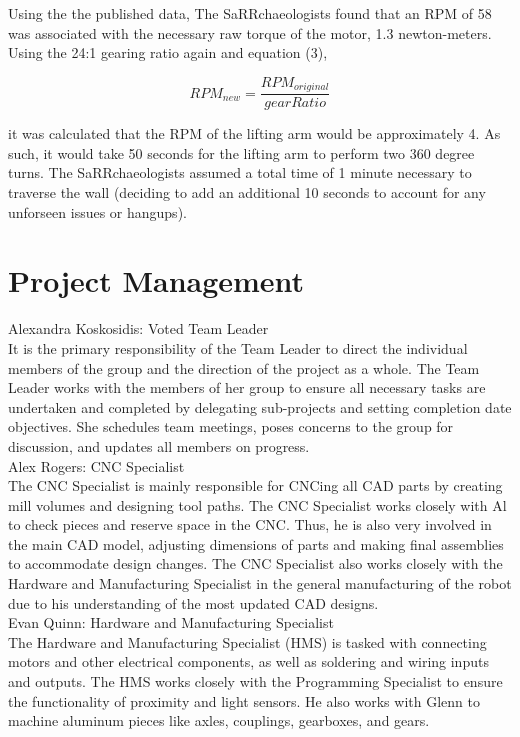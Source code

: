 \documentclass[12pt]{article}
\begin{document}
Using the the published data, The SaRRchaeologists found that an RPM of 58 was associated with the necessary raw torque of the motor, 1.3 newton-meters. Using the 24:1 gearing ratio again and equation (3),

\begin{equation}
    RPM_{new} = \frac{RPM_{original}}{gearRatio} 
\end{equation}


it was calculated that the RPM of the lifting arm would be approximately 4. As such, it would take 50 seconds for the lifting arm to perform two 360 degree turns. The SaRRchaeologists assumed a total time of 1 minute necessary to traverse the wall (deciding to add an additional 10 seconds to account for any unforseen issues or hangups). 

\section{Project Management}
Alexandra Koskosidis: Voted Team Leader\\

    It is the primary responsibility of the Team Leader to direct the individual members of the group and the direction of the project as a whole. The Team Leader works with the members of her group to ensure all necessary tasks are undertaken and completed by delegating sub-projects and setting completion date objectives. She schedules team meetings, poses concerns to the group for discussion, and updates all members on progress.\\
    
Alex Rogers: CNC Specialist\\

    The CNC Specialist is mainly responsible for CNCing all CAD parts by creating mill volumes and designing tool paths. The CNC Specialist works closely with Al to check pieces and reserve space in the CNC. Thus, he is also very involved in the main CAD model, adjusting dimensions of parts and making final assemblies to accommodate design changes. The CNC Specialist also works closely with the Hardware and Manufacturing Specialist in the general manufacturing of the robot due to his understanding of the most updated CAD designs. \\
    
Evan Quinn: Hardware and Manufacturing Specialist\\

    The Hardware and Manufacturing Specialist (HMS) is tasked with connecting motors and other electrical components, as well as soldering and wiring inputs and outputs. The HMS works closely with the Programming Specialist to ensure the functionality of proximity and light sensors. He also works with Glenn to machine aluminum pieces like axles, couplings, gearboxes, and gears.\\
    
\end{document}
